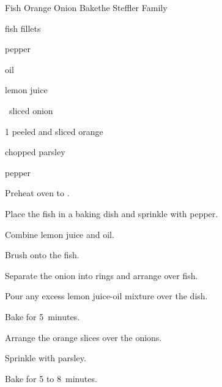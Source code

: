 \begin{recipe}{Fish Orange Onion Bake}{the Steffler Family}{}

\begin{ingredients}
\item \lbs{\half} fish fillets
\item \tp{\quarter} pepper
\item {} oil
\item {} lemon juice
\item \half{}~sliced onion
\item 1 peeled and sliced orange
\item {} chopped parsley
\item pepper
\end{ingredients}

\begin{directions}
\item Preheat oven to .
\item Place the fish in a baking dish and sprinkle with pepper.
\item Combine lemon juice and oil.
\item Brush onto the fish.
\item Separate the onion into rings and arrange over fish.
\item Pour any excess lemon juice-oil mixture over the dish.
\item Bake for 5~minutes.
\item Arrange the orange slices over the onions.
\item Sprinkle with parsley.
\item Bake for 5 to 8~minutes.
\end{directions}
\end{recipe}
